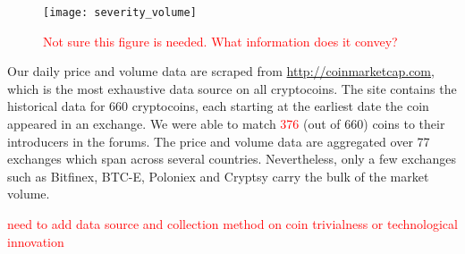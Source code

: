 \begin{figure}
\texttt{[image: severity\_volume]}
\caption{\textcolor{red}{Not sure this figure is needed. What information does it convey?}}
\end{figure}
Our daily price and volume data are scraped from \url{http://coinmarketcap.com}, which is the most exhaustive data source on all cryptocoins. The site contains the historical data for 660 cryptocoins, each starting at the earliest date the coin appeared in an exchange. We were able to match \textcolor{red}{376} (out of 660) coins to their introducers in the forums. The price and volume data are aggregated over 77 exchanges which span across several countries. Nevertheless, only a few exchanges such as Bitfinex, BTC-E, Poloniex and Cryptsy carry the bulk of the market volume.

\textcolor{red}{need to add data source and collection method on coin trivialness or technological innovation}


